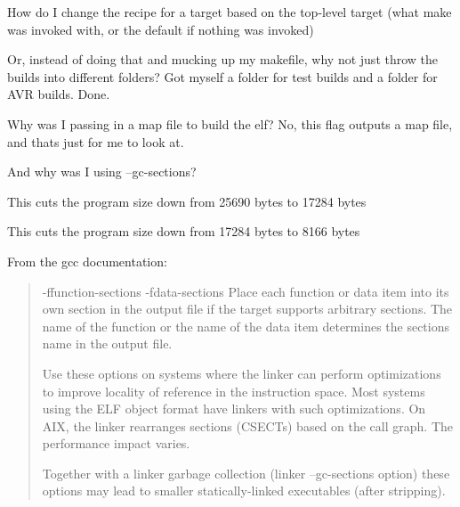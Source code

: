 How do I change the recipe for a target based on the top-\/level target (what make was invoked with, or the default if nothing was invoked)

Or, instead of doing that and mucking up my makefile, why not just throw the builds into different folders? Got myself a folder for test builds and a folder for AVR builds. Done.

Why was I passing in a map file to build the elf? No, this flag outputs a map file, and that\textquotesingle{}s just for me to look at.


\begin{DoxyCode}{0}

\end{DoxyCode}


And why was I using --gc-\/sections?

This cuts the program size down from 25690 bytes to 17284 bytes


\begin{DoxyCode}{0}

\end{DoxyCode}


This cuts the program size down from 17284 bytes to 8166 bytes 
\begin{DoxyCode}{0}

\end{DoxyCode}


From the gcc documentation\+:

\begin{quote}
-\/ffunction-\/sections -\/fdata-\/sections Place each function or data item into its own section in the output file if the target supports arbitrary sections. The name of the function or the name of the data item determines the section\textquotesingle{}s name in the output file.

Use these options on systems where the linker can perform optimizations to improve locality of reference in the instruction space. Most systems using the ELF object format have linkers with such optimizations. On AIX, the linker rearranges sections (CSECTs) based on the call graph. The performance impact varies.

Together with a linker garbage collection (linker --gc-\/sections option) these options may lead to smaller statically-\/linked executables (after stripping). \end{quote}
